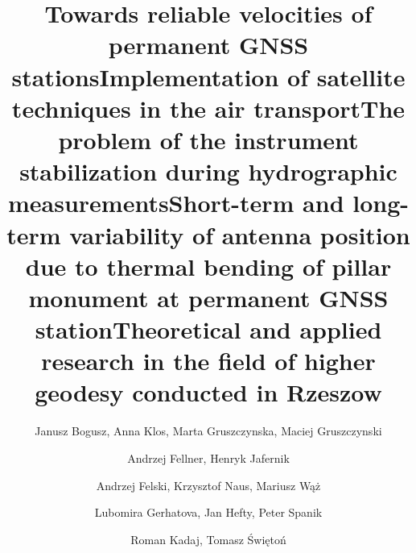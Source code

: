 \documentclass
[
  volume = 100,
  number = 1,
  year   = 2016,
]
{rgg}
\begin{document}

    \makecolophon

    \listofpapers

    \title{Towards reliable velocities of permanent GNSS stations}
    \author{Janusz Bogusz,  Anna Klos,  Marta Gruszczynska,  Maciej Gruszczynski}
    \addtopapers[43]

    \title
    {Implementation of satellite techniques in the air transport}
    \author
    {Andrzej Fellner, Henryk Jafernik}
    \addtopapers[52]

    \title{The problem of the instrument stabilization during hydrographic measurements}
    \author{Andrzej Felski, Krzysztof Naus, Mariusz Wąż}
    \addtopapers[1234]

    \title
    {Short-term and long-term variability of antenna position due to thermal bending of pillar monument at permanent GNSS station} 
    \author{Lubomira Gerhatova, Jan Hefty, Peter Spanik}
    \addtopapers

    \title
    {Theoretical and applied research in the field of higher geodesy conducted in Rzeszow}
    \author{Roman Kadaj, Tomasz Świętoń}
    \addtopapers[123456789]
\end{document}
